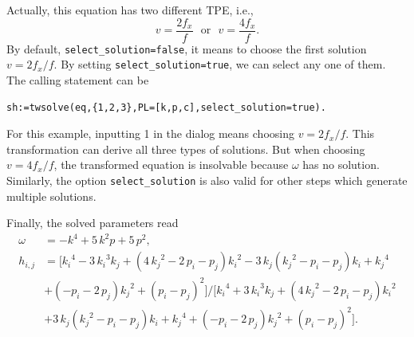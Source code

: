 Actually, this equation has two different TPE, i.e.,
\begin{equation}
v=\frac{2f_x}{f} \text{~~or~~} v=\frac{4f_x}{f}.
\end{equation}
By default, \texttt{select\_solution=false}, it means to choose the first solution $v=2f_x/f$. By setting \texttt{select\_solution=true}, we can select any one of them. The calling statement can be 
\begin{verbatim}
sh:=twsolve(eq,{1,2,3},PL=[k,p,c],select_solution=true).
\end{verbatim}
For this example, inputting 1 in the dialog means choosing $v=2f_x/f$. This transformation can derive all three types of solutions. But when choosing $v=4f_x/f$, the transformed equation is insolvable because $\omega$ has no solution. Similarly, the option \texttt{select\_solution} is also valid for other steps which generate multiple solutions.

Finally, the solved parameters read
\begin{equation}
\begin{split}
\omega&=-{k}^{4}+5\,{k}^{2}p+5\,{p}^{2}, \\ 
h_{i,j}&=[{k_{{i}}}^{4}-3\,{k_{{i}}}^{3}k_{{j}}+ \left( 4\,{k_{{j}}}^{2}-2\,p_{{i}}-p_{{j}} \right) {k_{{i}}}^{2}-3\,k_{{j}} \left( {k_{{j}}}^{2}-p_{{i}}-p_{{j}} \right) k_{{i}}+{k_{{j}}}^{4}\\
&+\left( -p_{{i}}-2\,p_{{j}}\right) {k_{{j}}}^{2}+ \left( p_{{i}}-p_{{j}} \right) ^{2}]/[{k_{{i}}}^{4}+3\,{k_{{i}}}^{3}k_{{j}}+ \left( 4\,{k_{{j}}}^{2}-2\,p_{{i}}-p_{{j}} \right) {k_{{i}}}^{2}\\
&+3\,k_{{j}} \left( {k_{{j}}}^{2}-p_{{i}}-p_{{j}} \right) k_{{i}}+{k_{{j}}}^{4}+ \left( -p_{{i}}-2\,p_{{j}}\right) {k_{{j}}}^{2}+ \left( p_{{i}}-p_{{j}} \right) ^{2}].
\end{split}
\end{equation}

